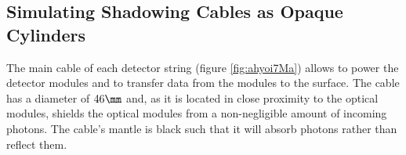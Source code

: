 
\subsection{Simulating Shadowing Cables as Opaque Cylinders}
\label{sec:cables}


The main cable of each detector string (figure \ref{fig:ahyoi7Ma}) allows to power the detector modules and to transfer data from the modules to the surface. The cable has a diameter of $46\mm$ \cite{instrumentation} and, as it is located in close proximity to the optical modules, shields the optical modules from a non-negligible amount of incoming photons. The cable's mantle is black such that it will absorb photons rather than reflect them.

